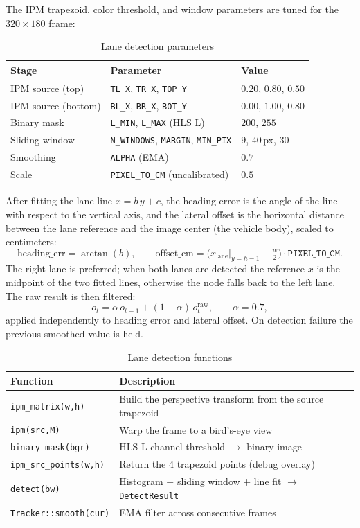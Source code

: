 \documentclass[12pt,a4paper]{article}
\begin{document}
The IPM trapezoid, color threshold, and window parameters are tuned for the
$320 \times 180$ frame:

\begin{table}[H]
\centering
\begin{tabular}{lll}
\hline
\textbf{Stage} & \textbf{Parameter} & \textbf{Value} \\
\hline
IPM source (top)    & \texttt{TL\_X}, \texttt{TR\_X}, \texttt{TOP\_Y} & $0.20$, $0.80$, $0.50$ \\
IPM source (bottom) & \texttt{BL\_X}, \texttt{BR\_X}, \texttt{BOT\_Y} & $0.00$, $1.00$, $0.80$ \\
Binary mask         & \texttt{L\_MIN}, \texttt{L\_MAX} (HLS L)       & $200$, $255$ \\
Sliding window      & \texttt{N\_WINDOWS}, \texttt{MARGIN}, \texttt{MIN\_PIX} & $9$, $40$\,px, $30$ \\
Smoothing           & \texttt{ALPHA} (EMA)                           & $0.7$ \\
Scale               & \texttt{PIXEL\_TO\_CM} (uncalibrated)          & $0.5$ \\
\hline
\end{tabular}
\caption{Lane detection parameters}
\end{table}

After fitting the lane line $x = b\,y + c$, the heading error is the angle of
the line with respect to the vertical axis, and the lateral offset is the
horizontal distance between the lane reference and the image center (the
vehicle body), scaled to centimeters:
\[
  \text{heading\_err} = \arctan(b),
  \qquad
  \text{offset\_cm} = \bigl(x_{\text{lane}}\big|_{y=h-1} - \tfrac{w}{2}\bigr)\cdot \texttt{PIXEL\_TO\_CM}.
\]
The right lane is preferred; when both lanes are detected the reference $x$ is
the midpoint of the two fitted lines, otherwise the node falls back to the left
lane. The raw result is then filtered:
\[
  o_t = \alpha\, o_{t-1} + (1-\alpha)\, o_t^{\text{raw}}, \qquad \alpha = 0.7,
\]
applied independently to heading error and lateral offset. On detection
failure the previous smoothed value is held.

\begin{table}[H]
\centering
\begin{tabular}{ll}
\hline
\textbf{Function} & \textbf{Description} \\
\hline
\texttt{ipm\_matrix(w,h)}      & Build the perspective transform from the source trapezoid \\
\texttt{ipm(src,M)}            & Warp the frame to a bird's-eye view \\
\texttt{binary\_mask(bgr)}     & HLS L-channel threshold $\rightarrow$ binary image \\
\texttt{ipm\_src\_points(w,h)} & Return the 4 trapezoid points (debug overlay) \\
\texttt{detect(bw)}            & Histogram + sliding window + line fit $\rightarrow$ \texttt{DetectResult} \\
\texttt{Tracker::smooth(cur)}  & EMA filter across consecutive frames \\
\hline
\end{tabular}
\caption{Lane detection functions}
\end{table}
\end{document}
